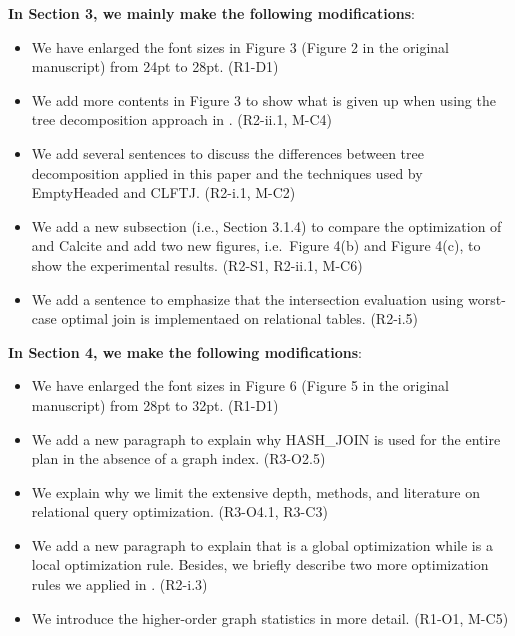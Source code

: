 \textbf{In Section 3, we mainly make the following modifications}:
\begin{itemize}
	\item We have enlarged the font sizes in Figure 3 (Figure 2 in the original manuscript) from 24pt to 28pt. (R1-D1)
	\item We add more contents in Figure 3 to show what is given up when using the tree decomposition approach in \name. (R2-ii.1, M-C4)
	\item We add several sentences to discuss the differences between tree decomposition applied in this paper and the techniques used by EmptyHeaded and CLFTJ. (R2-i.1, M-C2)
	\item We add a new subsection (i.e., Section 3.1.4) to compare the optimization of \name and Calcite and add two new figures, i.e.~Figure 4(b) and Figure 4(c), to show the experimental results. (R2-S1, R2-ii.1, M-C6)
	\item We add a sentence to emphasize that the intersection evaluation using worst-case optimal join is implementaed on relational tables. (R2-i.5)
\end{itemize}

\textbf{In Section 4, we make the following modifications}:
\begin{itemize}
	\item We have enlarged the font sizes in Figure 6 (Figure 5 in the original manuscript) from 28pt to 32pt. (R1-D1)
	\item We add a new paragraph to explain why HASH\_JOIN is used for the entire plan in the absence of a graph index. (R3-O2.5)
	\item We explain why we limit the extensive depth, methods, and literature on relational query optimization. (R3-O4.1, R3-C3)
	\item We add a new paragraph to explain that \filterrule is a global optimization while \fusionrule is a local optimization rule. Besides, we briefly describe two more optimization rules we applied in \name. (R2-i.3)
	\item We introduce the higher-order graph statistics in more detail. (R1-O1, M-C5)
\end{itemize}

